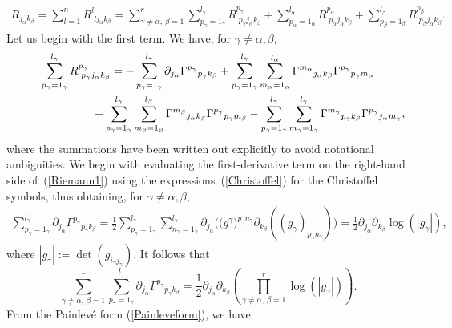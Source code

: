 \documentclass[pdftex]{sigma}
\numberwithin{equation}{section}
\newcommand{\jalpha}{j_{\alpha}}
\newcommand{\kbeta}{k_{\beta}}
\newcommand{\pgamma}{p_{\gamma}}
\newcommand{\malpha}{m_{\alpha}}
\newcommand{\mbeta}{m_{\beta}}
\newcommand{\mgamma}{m_{\gamma}}
\newcommand{\lbeta}{l_{\beta}}
\newcommand{\lalpha}{l_{\alpha}}
\newcommand{\palpha}{p_{\alpha}}
\newcommand{\pbeta}{p_{\beta}}
\newcommand{\ngamma}{n_{\gamma}}
\newcommand{\igamma}{i_{\gamma}}
\newcommand{\jgamma}{j_{\gamma}}
\newcommand{\lgamma}{l_{\gamma}}
\begin{document}
\begin{gather}\label{Riccidecomp}
R_{\jalpha \kbeta}=\sum_{l=1}^{n}R^{l}_{{\phantom l} l \jalpha \kbeta}=\sum_{\gamma \neq \alpha,\, \beta=1}^{r}\sum_{\pgamma=1_{\gamma}}^{\lgamma}R^{\pgamma}_{{\phantom l} \pgamma \jalpha \kbeta} + \sum_{\palpha =1_{\alpha}}^{\lalpha}R^{\palpha}_{{\phantom l} \palpha \jalpha \kbeta}+\sum_{\pbeta=1_{\beta}}^{\lbeta}R^{\pbeta}_{{\phantom l} \pbeta \jalpha \kbeta}.
\end{gather}
Let us begin with the first term. We have, for $\gamma\neq \alpha, \beta$,
\begin{gather}
\sum_{\pgamma = 1_{\gamma}}^{\lgamma}R^{\pgamma}_{{\phantom l} \pgamma \jalpha \kbeta}=-\sum_{\pgamma = 1_{\gamma}}^{\lgamma}\partial_{\jalpha}{\Gamma^{\pgamma}}_{\pgamma \kbeta} +\sum_{\pgamma = 1_{\gamma}}^{\lgamma}\sum_{\malpha=1_{\alpha}}^{\lalpha}{\Gamma^{\malpha}}_{\jalpha \kbeta}{\Gamma^{\pgamma}}_{\pgamma \malpha}\nonumber\\
\hphantom{\sum_{\pgamma = 1_{\gamma}}^{\lgamma}R^{\pgamma}_{{\phantom l} \pgamma \jalpha \kbeta}=}{}
+\sum_{\pgamma = 1_{\gamma}}^{\lgamma}\sum_{\mbeta=1_{\beta}}^{\lbeta}{\Gamma^{\mbeta}}_{\jalpha \kbeta}{\Gamma^{\pgamma}}_{\pgamma \mbeta} -\sum_{\pgamma = 1_{\gamma}}^{\lgamma}\sum_{\mgamma=1_{\gamma}}^{\lgamma}{\Gamma^{\mgamma}}_{\pgamma \kbeta}{\Gamma^{\pgamma}}_{\jalpha \mgamma},\label{Riemann1}
\end{gather}
where the summations have been written out explicitly to avoid notational ambiguities. We begin with evaluating the first-derivative term on the right-hand side of~(\ref{Riemann1}) using the expressions~(\ref{Christoffel}) for the Christoffel symbols, thus obtaining, for $\gamma \neq \alpha, \beta$,
\begin{gather}\label{derivgamma}
\sum_{\pgamma = 1_{\gamma}}^{\lgamma}\partial_{\jalpha}{\Gamma^{\pgamma}}_{\pgamma \kbeta} = \frac{1}{2}\sum_{\pgamma = 1_{\gamma}}^{\lgamma}\sum_{\ngamma = 1_{\gamma}}^{\lgamma}\partial_{\jalpha}\big(\big(g^{\gamma}\big)^{\pgamma \ngamma}\partial_{\kbeta}((g_{\gamma})_{\pgamma \ngamma})\big)=\frac{1}{2}\partial_{\jalpha}\partial_{\kbeta}\log(|g_{\gamma}|),
\end{gather}
where $|g_{\gamma}|:=\det(g_{\igamma \jgamma})$. It follows that
\[
\sum_{\gamma \neq \alpha,\, \beta=1}^{r}\sum_{\pgamma=1_{\gamma}}^{\lgamma}\partial_{\jalpha}{\Gamma^{\pgamma}}_{\pgamma \kbeta}= \frac{1}{2}\partial_{\jalpha}\partial_{\kbeta}\left(\prod_{\gamma \neq \alpha, \,\beta=1}^{r}\log(|g_{\gamma}|)\right).
\]
From the Painlev\'e form (\ref{Painleveform}), we have
\end{document}
